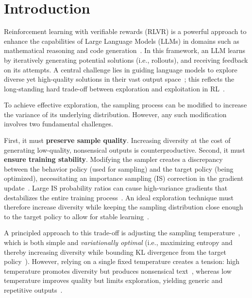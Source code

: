 \section{Introduction}
\label{sec:introduction}

Reinforcement learning with verifiable rewards (RLVR) is a powerful approach to enhance the capabilities of Large Language Models (LLMs) in domains such as mathematical reasoning and code generation~\citep{openai2024learning, guo2025deepseek, team2025kimi, yang2025qwen3}. 
In this framework, an LLM learns by iteratively generating potential solutions (i.e., rollouts), and receiving feedback on its attempts. 
A central challenge lies in guiding language models to explore diverse yet high-quality solutions in their vast output space~\citep{cheng2025reasoning};
this reflects the long-standing hard trade-off between exploration and exploitation in RL~\citep{thrun1992efficient, sutton1998reinforcement}.

To achieve effective exploration, the sampling process can be modified to increase the variance of its underlying distribution.
However, any such modification involves two fundamental challenges.

First, it must \textbf{preserve sample quality}. Increasing diversity at the cost of generating low-quality, nonsensical outputs is counterproductive.
Second, it must \textbf{ensure training stability}.
Modifying the sampler creates a discrepancy between the behavior policy (used for sampling) and the target policy (being optimized), necessitating an importance sampling (IS) correction in the gradient update~\citep{degris2012off}.
Large IS probability ratios can cause high-variance gradients that destabilizes the entire training process~\citep{schulman2017proximal}.
An ideal exploration technique must therefore increase diversity while keeping the sampling distribution close enough to the target policy to allow for stable learning~\citep{haarnoja2018soft, ziegler2019fine}.

A principled approach to this trade-off is adjusting the sampling temperature~\citep{ACKLEY1985147, hou2025t1}, which is both simple and \emph{variationally optimal} (i.e., maximizing entropy and thereby increasing diversity while bounding KL divergence from the target policy~\citep{jaynes1957information}).
However, relying on a single fixed temperature creates a tension:
high temperature promotes diversity but produces nonsensical text~\citep{renze-2024-effect, wang2025beyond},
whereas low temperature improves quality but limits exploration, yielding generic and repetitive outputs~\citep{Holtzman2020The, guo2025deepseek}.

